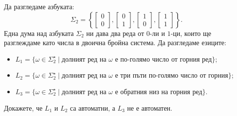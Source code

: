 \begin{problem}
  Да разгледаме азбуката:
  \[\Sigma_2 = \left\{\begin{bmatrix} 0\\0\end{bmatrix},\begin{bmatrix} 0\\1\end{bmatrix},\begin{bmatrix} 1\\0\end{bmatrix},\begin{bmatrix} 1\\1\end{bmatrix}\right\}.\]
  Една дума над азбуката $\Sigma_2$ ни дава два реда от $0$-ли и $1$-ци, които ще разглеждаме като числа в двоична бройна система.
  Да разгледаме езиците:
  \begin{itemize}
  \item 
    $L_1 = \{\omega \in \Sigma^\star_2 \mid \text{долният ред на }\omega\text{ е по-голямо число от горния ред}\}$;
  \item
    $L_2 = \{\omega \in \Sigma^\star_2 \mid \text{долният ред на }\omega\text{ е три пъти по-голямо число от горния}\}$;
  \item
    $L_3 = \{\omega \in \Sigma^\star_2 \mid \text{долният ред на }\omega\text{ е обратния низ на горния ред}\}$.
  \end{itemize}
  Докажете, че  $L_1$ и $L_2$ са автоматни, а $L_3$ не е автоматен.
\end{problem}
\ifhints
